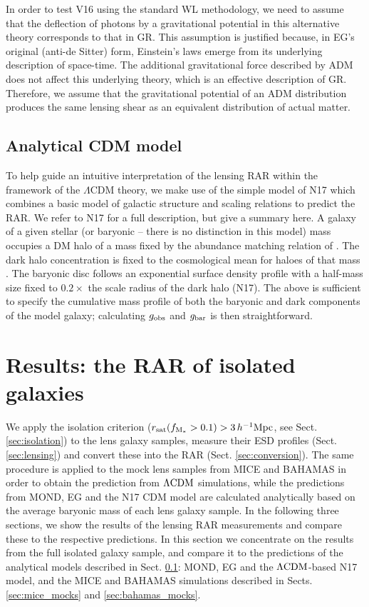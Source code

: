 \documentclass[usenatbib]{mnras}
\newcommand{\hMpc}{\, h^{-1}{\rm{Mpc}} }
\newcommand{\lcdm}{{\rm \Lambda CDM}}
\newcommand{\un}[1]{_{\rm #1}}
\begin{document}
In order to test V16 using the standard WL methodology, we need to assume that the deflection of photons by a gravitational potential in this alternative theory corresponds to that in GR. This assumption is justified because, in EG's original (anti-de Sitter) form, Einstein's laws emerge from its underlying description of space-time. The additional gravitational force described by ADM does not affect this underlying theory, which is an effective description of GR. Therefore, we assume that the gravitational potential of an ADM distribution produces the same lensing shear as an equivalent distribution of actual matter.

\subsection{Analytical CDM model}
\label{sec:analytical}

To help guide an intuitive interpretation of the lensing RAR within the framework of the $\Lambda$CDM theory, we make use of the simple model of N17 which combines a basic model of galactic structure and scaling relations to predict the RAR. We refer to N17 for a full description, but give a summary here. A galaxy of a given stellar (or baryonic -- there is no distinction in this model) mass occupies a DM halo of a mass fixed by the abundance matching relation of \citet{behroozi2013}. The dark halo concentration is fixed to the cosmological mean for haloes of that mass \citep{ludlow2014}. The baryonic disc follows an exponential surface density profile with a half-mass size fixed to $0.2\times$ the scale radius of the dark halo (N17). The above is sufficient to specify the cumulative mass profile of both the baryonic and dark components of the model galaxy; calculating $g\un{obs}$ and $g\un{bar}$ is then straightforward.


\section{Results: the RAR of isolated galaxies}
\label{sec:results}

We apply the isolation criterion ($r\un{sat}(f\un{M_*}>0.1)>3\hMpc$, see Sect. \ref{sec:isolation}) to the lens galaxy samples, measure their ESD profiles (Sect. \ref{sec:lensing}) and convert these into the RAR (Sect. \ref{sec:conversion}). The same procedure is applied to the mock lens samples from MICE and BAHAMAS in order to obtain the prediction from $\lcdm$ simulations, while the predictions from MOND, EG and the N17 CDM model are calculated analytically based on the average baryonic mass of each lens galaxy sample. In the following three sections, we show the results of the lensing RAR measurements and compare these to the respective predictions. In this section we concentrate on the results from the full isolated galaxy sample, and compare it to the predictions of the analytical models described in Sect. \ref{sec:analytical}: MOND, EG and the $\lcdm$-based N17 model, and the MICE and BAHAMAS simulations described in Sects. \ref{sec:mice_mocks} and \ref{sec:bahamas_mocks}.
\end{document}

